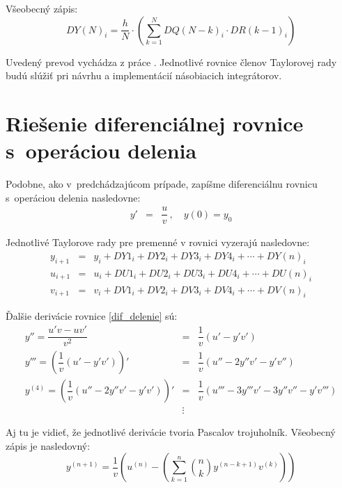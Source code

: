 Všeobecný zápis:
\begin{equation}
DY(N)_{i} = \dfrac{h}{N} \cdot \left( \sum_{k=1}^N DQ(N-k)_{i} \cdot DR(k-1)_{i} \right) \label{suma_mul}
\end{equation}

Uvedený prevod vychádza z práce \cite{ZavadaBP}. Jednotlivé rovnice členov Taylorovej rady budú slúžiť pri návrhu a implementácií násobiacich integrátorov.


\section{Riešenie diferenciálnej rovnice s~operáciou delenia}
Podobne, ako v~predchádzajúcom prípade, zapíšme diferenciálnu rovnicu s~operáciou delenia nasledovne:
\begin{eqnarray}
y' & = & \dfrac{u}{v} \, , \quad y(0) = y_{0} \label{dif_delenie}
\end{eqnarray}



Jednotlivé Taylorove rady pre premenné v rovnici vyzerajú nasledovne:
\begin{eqnarray}
y_{i + 1} & = & y_{i} + DY1_{i} + DY2_{i} + DY3_{i} + DY4_{i} + \cdots + DY(n)_{i}\\
u_{i+1} & = & u_i + DU1_i + DU2_i + DU3_i + DU4_i + \cdots + DU(n)_i\\
v_{i+1} & = & v_i + DV1_i + DV2_i + DV3_i + DV4_i + \cdots + DV(n)_i
\end{eqnarray}



Ďalšie derivácie rovnice \eqref{dif_delenie} sú:
\begin{eqnarray}
y'' = \dfrac{u'v - uv'}{v^{2}} & = & \dfrac{1}{v} (u' - y'v') \label{derivacie_delenie} \\
y''' = \left( \dfrac{1}{v} (u' - y'v') \right)' & = & \dfrac{1}{v} (u'' - 2y''v' - y'v'') \nonumber \\
y^{(4)} = \left( \dfrac{1}{v} (u'' - 2y''v' - y'v') \right)' & = & \dfrac{1}{v} (u''' - 3y'''v' - 3y''v'' - y'v''') \nonumber \\
 & \vdots \nonumber &
\end{eqnarray}

Aj tu je vidieť, že jednotlivé derivácie tvoria Pascalov trojuholník. Všeobecný zápis je nasledovný:
\begin{equation}
y^{(n+1)} = \dfrac{1}{v} \left( u^{(n)} - \left( \sum_{k=1}^n \binom{n}{k} y^{(n-k+1)} v^{(k)} \right) \right) \nonumber
\end{equation}
\bigskip

